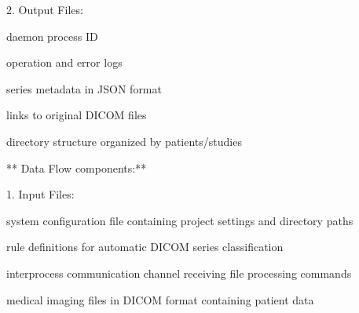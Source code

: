 \documentclass[letterpaper,10pt,english]{sphinxmanual}
\begin{document}
\begin{DUlineblock}{0em}
\item[] 2. Output Files:
\end{DUlineblock}

\begin{DUlineblock}{0em}
\item[] \sphinxhyphen{}  \sphinxhyphen{} daemon process ID
\item[] \sphinxhyphen{}  \sphinxhyphen{} operation and error logs
\item[] \sphinxhyphen{}  \sphinxhyphen{} series metadata in JSON format
\item[] \sphinxhyphen{}  \sphinxhyphen{} links to original DICOM files
\item[] \sphinxhyphen{}  \sphinxhyphen{} directory structure organized by patients/studies
\end{DUlineblock}

\sphinxAtStartPar
{}


\sphinxAtStartPar
** Data Flow components:**

\begin{DUlineblock}{0em}
\item[] 1. Input Files:
\end{DUlineblock}

\begin{DUlineblock}{0em}
\item[] \sphinxhyphen{}  \sphinxhyphen{} system configuration file containing project settings and directory paths
\item[] \sphinxhyphen{}  \sphinxhyphen{} rule definitions for automatic DICOM series classification
\item[] \sphinxhyphen{}  \sphinxhyphen{} inter\sphinxhyphen{}process communication channel receiving file processing commands
\item[] \sphinxhyphen{}  \sphinxhyphen{} medical imaging files in DICOM format containing patient data
\end{DUlineblock}
\end{document}
